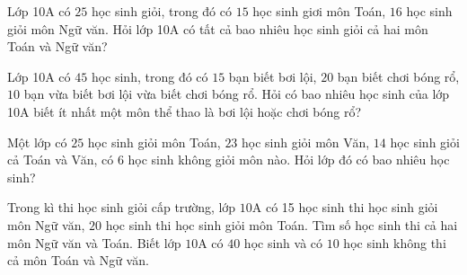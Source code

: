 \begin{ex}
Lớp 10A có $25$ học sinh giỏi, trong đó có $15$ học sinh giơi môn Toán, $16$ học sinh giỏi môn Ngữ văn. Hỏi lớp 10A có tất cả bao nhiêu học sinh giỏi cả hai môn Toán và Ngữ văn?
\end{ex}

\begin{ex}
Lớp 10A có $45$ học sinh, trong đó có $15$ bạn biết bơi lội, $20$ bạn biết chơi bóng rổ, $10$ bạn vừa biết bơi lội vừa biết chơi bóng rổ. Hỏi có bao nhiêu học sinh của lớp 10A biết ít nhất một môn thể thao là bơi lội hoặc chơi bóng rổ?
\end{ex}

\begin{ex}
Một lớp có $25$ học sinh giỏi môn Toán, $23$ học sinh giỏi môn Văn, $14$ học sinh giỏi cả Toán và Văn, có $6$ học sinh không giỏi môn nào. Hỏi lớp đó có bao nhiêu học sinh?
\end{ex}

\begin{ex}
Trong kì thi học sinh giỏi cấp trường, lớp $10 \mathrm{A}$ có 15 học sinh thi học sinh giỏi môn Ngữ văn, $20$ học sinh thi học sinh giỏi môn Toán. Tìm số học sinh thi cả hai môn Ngữ văn và Toán. Biết lớp $10 \mathrm{A}$ có $40$ học sinh và có $10$ học sinh không thi cả môn Toán và Ngữ văn.
\end{ex}

